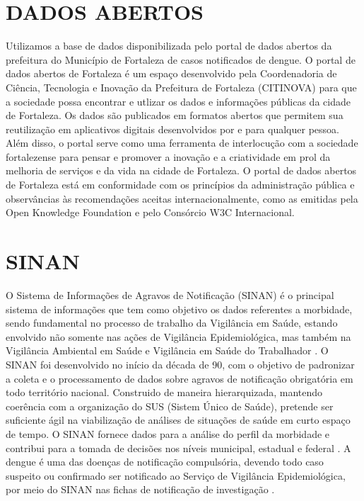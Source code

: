 \documentclass[
	12pt,				%
	openright,			%
	oneside,	
	a4paper,				%
	english,				%
	brazil				%
]{abntex2/abntex2} %
\begin{document}
	\section{DADOS ABERTOS}
	\vspace{1\baselineskip}
	Utilizamos a base de dados disponibilizada pelo portal de dados abertos da prefeitura do Município de Fortaleza de casos notificados de dengue. O portal de dados abertos de Fortaleza é um espaço desenvolvido pela Coordenadoria de Ciência, Tecnologia e Inovação da Prefeitura de Fortaleza (CITINOVA) para que a sociedade possa encontrar e utlizar os dados e informações públicas da cidade de Fortaleza. Os dados são publicados em formatos abertos que permitem sua reutilização em aplicativos digitais desenvolvidos por e para qualquer pessoa. Além disso, o portal serve como uma ferramenta de interlocução com a sociedade fortalezense para pensar e promover  a inovação e a criatividade em prol da melhoria de serviços e da vida na cidade de Fortaleza. O portal de dados abertos de Fortaleza está em conformidade com os princípios da administração pública e observâncias às recomendações aceitas internacionalmente, como as emitidas pela Open Knowledge Foundation e pelo Consórcio W3C Internacional.
		
	\vspace{-1.5\baselineskip}	
	\section{SINAN}
	\vspace{1\baselineskip}
	O Sistema de Informações de Agravos de Notificação (SINAN) é o principal sistema de informações que tem como objetivo os dados referentes a morbidade, sendo fundamental no processo de trabalho da Vigilância em Saúde, estando envolvido não somente nas ações de Vigilância Epidemiológica, mas também na Vigilância Ambiental em Saúde e Vigilância em Saúde do Trabalhador \cite{conass:2015}.
	O SINAN foi desenvolvido no início da década de 90, com o objetivo de padronizar a coleta e o processamento de dados sobre agravos de notificação obrigatória em todo território nacional. Construido de maneira hierarquizada, mantendo coerência com a organização do SUS (Sistem Único de Saúde), pretende ser suficiente ágil na viabilização de análises de situações de saúde em curto espaço de tempo. O SINAN fornece dados para a análise do perfil da morbidade e contribui para a tomada de decisões nos níveis municipal, estadual e federal \cite{saude:2008}.
	A dengue é uma das doenças de notificação compulsória, devendo todo caso suspeito ou confirmado ser notificado ao Serviço de Vigilância Epidemiológica, por meio do SINAN nas fichas de notificação de investigação \cite{saude:2008}.
	\vspace{-1.5\baselineskip}
	
\end{document}
